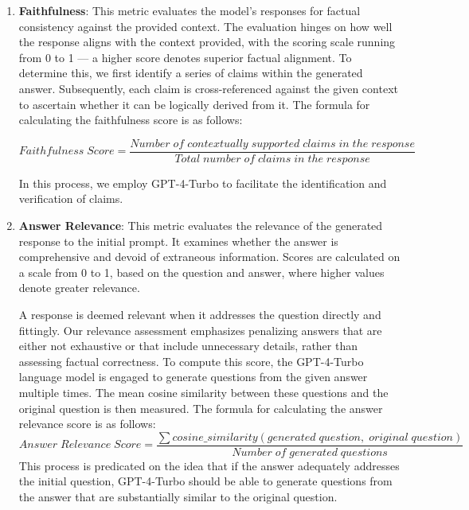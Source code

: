 \documentclass[runningheads]{llncs}
\begin{document}
\begin{enumerate}

    \item \textbf{Faithfulness}: This metric evaluates the model's responses for factual consistency against the provided context. The evaluation hinges on how well the response aligns with the context provided, with the scoring scale running from 0 to 1 — a higher score denotes superior factual alignment. To determine this, we first identify a series of claims within the generated answer. Subsequently, each claim is cross-referenced against the given context to ascertain whether it can be logically derived from it. The formula for calculating the faithfulness score is as follows:

\[
    Faithfulness\;Score = \frac{Number\;of\;contextually\;supported\;claims\;in\;the\;response}{Total\;number\;of\;claims\;in\;the\;response}
\]

    In this process, we employ GPT-4-Turbo to facilitate the identification and verification of claims.

    
    \item \textbf{Answer Relevance}: This metric evaluates the relevance of the generated response to the initial prompt. It examines whether the answer is comprehensive and devoid of extraneous information. Scores are calculated on a scale from 0 to 1, based on the question and answer, where higher values denote greater relevance.

    A response is deemed relevant when it addresses the question directly and fittingly. Our relevance assessment emphasizes penalizing answers that are either not exhaustive or that include unnecessary details, rather than assessing factual correctness. To compute this score, the GPT-4-Turbo language model is engaged to generate questions from the given answer multiple times. The mean cosine similarity between these questions and the original question is then measured. The formula for calculating the answer relevance score is as follows:
\[
    Answer\;Relevance\;Score = \frac{ \sum cosine\_similarity(generated\;question,\;original\;question)}{Number\;of\;generated\;questions}
\]
    This process is predicated on the idea that if the answer adequately addresses the initial question, GPT-4-Turbo should be able to generate questions from the answer that are substantially similar to the original question.
    

\end{enumerate}
\end{document}
